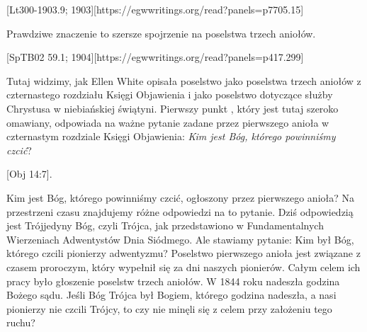  \label{chap:remembering-the-beginning}

[Lt300-1903.9; 1903][https://egwwritings.org/read?panels=p7705.15]

Prawdziwe znaczenie  to szersze spojrzenie na poselstwa trzech aniołów.

[SpTB02 59.1; 1904][https://egwwritings.org/read?panels=p417.299]

Tutaj widzimy, jak Ellen White opisała poselstwo  jako poselstwa trzech aniołów z czternastego rozdziału Księgi Objawienia i jako poselstwo dotyczące służby Chrystusa w niebiańskiej świątyni. Pierwszy punkt , który jest tutaj szeroko omawiany, odpowiada na ważne pytanie zadane przez pierwszego anioła w czternastym rozdziale Księgi Objawienia: \textit{Kim jest Bóg, którego powinniśmy czcić}?

[Obj 14:7].

Kim jest Bóg, którego powinniśmy czcić, ogłoszony przez pierwszego anioła? Na przestrzeni czasu znajdujemy różne odpowiedzi na to pytanie. Dziś odpowiedzią jest Trójjedyny Bóg, czyli Trójca, jak przedstawiono w Fundamentalnych Wierzeniach Adwentystów Dnia Siódmego. Ale stawiamy pytanie: Kim był Bóg, którego czcili pionierzy adwentyzmu? Poselstwo pierwszego anioła jest związane z czasem proroczym, który wypełnił się za dni naszych pionierów. Całym celem ich pracy było głoszenie poselstw trzech aniołów. W 1844 roku nadeszła godzina Bożego sądu. Jeśli Bóg Trójca był Bogiem, którego godzina nadeszła, a nasi pionierzy nie czcili Trójcy, to czy nie minęli się z celem przy założeniu tego ruchu?

